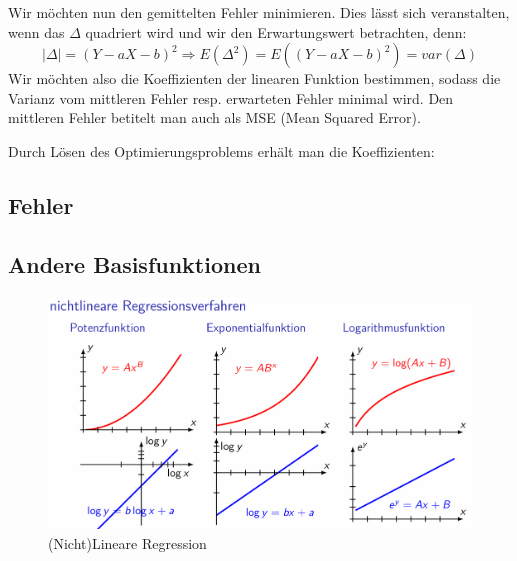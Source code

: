 \documentclass[../Main.tex]{subfiles}
\begin{document}
Wir möchten nun den gemittelten Fehler minimieren. Dies lässt sich veranstalten,
wenn das \(\Delta\) quadriert wird und wir den Erwartungswert betrachten, denn:
\begin{equation}
    |\Delta| = (Y-aX-b)^2 \Rightarrow E(\Delta^2) = E((Y-aX-b)^2) = var(\Delta)
\end{equation}
Wir möchten also die Koeffizienten der linearen Funktion bestimmen, sodass
die Varianz vom mittleren Fehler resp. erwarteten Fehler minimal wird. Den 
mittleren Fehler betitelt man auch als MSE (Mean Squared Error).

Durch Lösen des Optimierungsproblems erhält man die Koeffizienten:

\subsection{Fehler}
\subsection{Andere Basisfunktionen}
\begin{figure}[H]
    \centering  %
    \includegraphics[height=0.5\textwidth]{Images/nichtlineare_regression.png}
    \caption{(Nicht)Lineare Regression}
\end{figure}
\newpage
\end{document}
